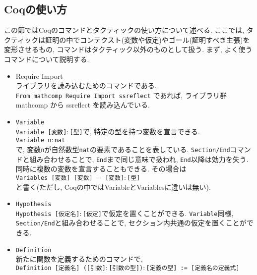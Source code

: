 \documentclass[11pt]{jarticle}
\theoremstyle{mystyle}
\newcommand{\0}{\textbf{0}}
\newcommand{\1}{\textbf{1}}
\newcommand{\2}{\textbf{2}}
\begin{document}
\subsection{Coqの使い方} \label{sssec coq_use}
この節ではCoqのコマンドとタクティックの使い方について述べる. ここでは, タクティックは証明の中でコンテクスト(変数や仮定)やゴール(証明すべき主張)を変形させるもの, コマンドはタクティック以外のものとして扱う. 
まず, よく使うコマンドについて説明する. 
\begin{itemize}
  \item {Require Import} \\
    ライブラリを読み込むためのコマンドである. \\
    {\tt From mathcomp Require Import ssreflect}
    であれば, ライブラリ群 mathcomp から ssreflect を読み込んでいる.
  \item {\tt Variable} \\
    {\tt Variable [変数]$\colon$[型]}で, 特定の型を持つ変数を宣言できる. \\
    {\tt Variable n$\colon$nat}\\
    で, 変数{\tt n}が自然数型{\tt nat}の要素であることを表している. 
    {\tt Section/End}コマンドと組み合わせることで, {\tt End}まで同じ意味で扱われ, 
    {\tt End}以降は効力を失う. 
    同時に複数の変数を宣言することもできる. その場合は\\
    {\tt Variables [変数] [変数] $\cdots$ [変数]$\colon$[型]}\\
    と書く(ただし, Coqの中では{Variable}と{Variables}に違いは無い).    
  \item {\tt Hypothesis} \\
    {\tt Hypothesis [仮定名]$\colon$[仮定]}で仮定を置くことができる. {\tt Variable}同様, 
    {\tt Section/End}と組み合わせることで, セクション内共通の仮定を置くことができる. 
  \item {\tt Definition} \\
    新たに関数を定義するためのコマンドで, \\
    {\tt Definition [定義名] ([引数]$\colon$[引数の型])$\colon$[定義の型] := 
    [定義名の定義式]}\\

\end{itemize}
\end{document}
